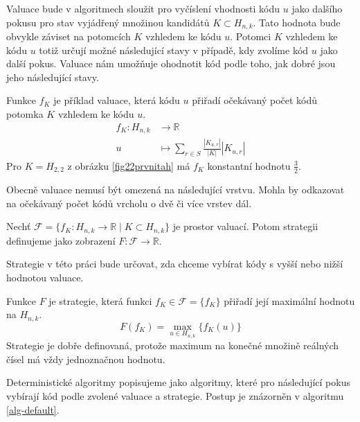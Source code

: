 Valuace bude v algoritmech sloužit pro vyčíslení vhodnosti kódu $u$ jako dalšího pokusu pro stav vyjádřený množinou kandidátů $K\subset H_{n,k}$. Tato hodnota bude obvykle záviset na potomcích $K$ vzhledem ke kódu $u$. Potomci $K$ vzhledem ke kódu $u$ totiž určují možné následující stavy v případě, kdy zvolíme kód $u$ jako další pokus. Valuace nám umožňuje ohodnotit kód podle toho, jak dobré jsou jeho následující stavy. 

\begin{prikl}\label{prjednokrokfce}
    Funkce $f_K$ je příklad valuace, která kódu $u$ přiřadí očekávaný počet kódů potomka $K$ vzhledem ke kódu $u$.
    \begin{align*}
        f_K \colon H_{n,k} &\to \mathbb{R} \\
        u &\mapsto \sum_{r\in S}\frac{|K_{u,r}|}{|K|}|K_{u,r}| 
    \end{align*}
    Pro $K = H_{2,2}$ z obrázku \ref{fig22prvnitah} má $f_{K}$ konstantní hodnotu $\frac{3}{2}$.
\end{prikl}
Obecně valuace nemusí být omezená na následující vrstvu. Mohla by odkazovat na očekávaný počet kódů vrcholu o dvě či více vrstev dál. 

\begin{definice}[Strategie]
    Nechť $\mathcal{F} = \{f_K\colon H_{n,k} \to \mathbb{R} \mid K \subset H_{n,k}\}$ je prostor valuací. Potom strategii definujeme jako zobrazení $F \colon \mathcal{F} \to \mathbb{R}$. 
\end{definice}
Strategie v této práci bude určovat, zda chceme vybírat kódy s vyšší nebo nižší hodnotou valuace.

\begin{prikl}\label{prstrategie}
    Funkce $F$ je strategie, která funkci $f_K \in \mathcal{F} = \{f_K\}$ přiřadí její maximální hodnotu na $H_{n,k}$.
    \[F(f_K) =  \max_{u\in H_{n,k}}\{f_K(u)\}\]
    Strategie je dobře definovaná, protože maximum na konečné množině reálných čísel má vždy jednoznačnou hodnotu.
\end{prikl}

Deterministické algoritmy popisujeme jako algoritmy, které pro následující pokus vybírají kód podle zvolené valuace a strategie. Postup je znázorněn v algoritmu \ref{alg-default}.

